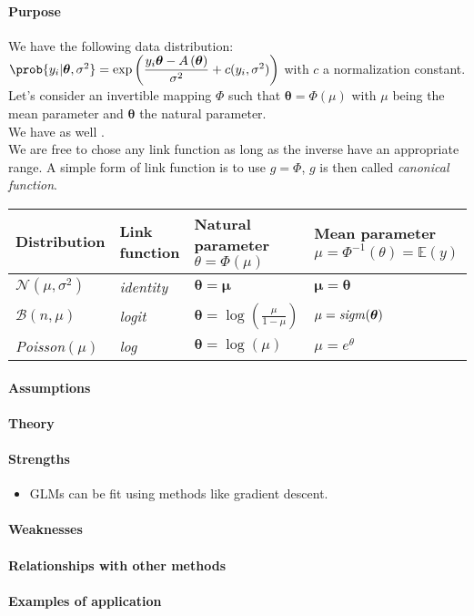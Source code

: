 \paragraph{Purpose}
We have the following data distribution:
$\prob{y_{i}|\bm{\theta},\sigma^{2}} = \exp\left(\dfrac{y_{i}\bm{\theta} - A\left(
\bm{\theta}\right)}{\sigma^{2}} + c(y_{i}, \sigma^{2})
\right)$
with $c$ a normalization constant.\\
Let's consider an invertible mapping $\Phi$ such that $\bm{\theta} = \Phi(\mu)$ with
$\mu$ being the mean parameter and $\bm{\theta}$ the natural parameter.\\
We have as well .\\
We are free to chose any link function as long as the inverse have an appropriate 
range. A simple form of link function is to use $g=\Phi$, $g$ is then called 
\emph{canonical function}.

\begin{center}
    \begin{tabular}{|*{4}{l|}}
    \hline
    \textbf{Distribution} & \textbf{Link function}  & 
    \textbf{Natural parameter} $\theta = \Phi(\mu)$ & \textbf{Mean parameter} $\mu = 
    \Phi^{-1}(\theta) = \mathbb{E}(y)$ \\
    \hline
    $\mathcal{N}(\mu, \sigma^{2})$ & \emph{identity} & $\bm{\theta} = \bm{\mu}$ & 
    $\bm{\mu} = \bm{\theta}$\\
    \hline
    $\mathcal{B}(n,\mu)$ & \emph{logit} & $\bm{\theta} = \log\left(\frac{\mu}{1-\mu}
    \right)$ & $\mu = \text{\emph{sigm}}(\bm{\theta})$\\
    \hline
    \emph{Poisson}$(\mu)$ & \emph{log} & $\bm{\theta} = \log\left(\mu\right)$ & 
    $\mu=e^{\theta}$\\
    \hline
    \end{tabular}
\end{center}

\paragraph{Assumptions}
\paragraph{Theory}
\paragraph{Strengths}
\begin{itemize}
    \item GLMs can be fit using methods like gradient descent.
\end{itemize}

\paragraph{Weaknesses}
\paragraph{Relationships with other methods}
\paragraph{Examples of application}

